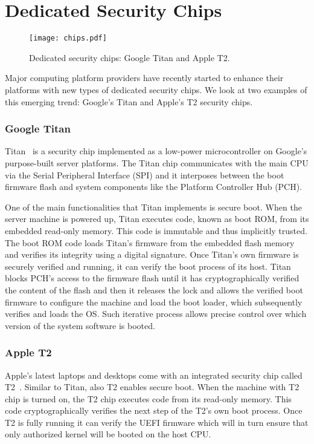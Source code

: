 \section*{Dedicated Security Chips}

\begin{figure}[t]
	\centering
	\texttt{[image: chips.pdf]}
	\caption{Dedicated security chips: Google Titan and Apple T2.}
\label{fig:prototype}   
\end{figure}


Major computing platform providers have recently started to enhance their platforms with new types of dedicated security chips. We look at two examples of this emerging trend: Google’s Titan and Apple’s T2 security chips.

\subsubsection*{Google Titan}

Titan~\cite{titan} is a security chip implemented as a low-power microcontroller on Google’s purpose-built server platforms. The Titan chip communicates with the main CPU via the Serial Peripheral Interface (SPI) and it interposes between the boot firmware flash and system components like the Platform Controller Hub (PCH).

 One of the main functionalities that Titan implements is secure boot. When the server machine is powered up, Titan executes code, known as boot ROM, from its embedded read-only memory. This code is immutable and thus implicitly trusted. The boot ROM code loads Titan’s firmware from the embedded flash memory and verifies its integrity using a digital signature. Once Titan’s own firmware is securely verified and running, it can verify the boot process of its host. Titan blocks PCH’s access to the firmware flash until it has cryptographically verified the content of the flash and then it releases the lock and allows the verified boot firmware to configure the machine and load the boot loader, which subsequently verifies and loads the OS. Such iterative process allows precise control over which version of the system software is booted. 

 
 \subsubsection*{Apple T2}
 
 Apple’s latest laptops and desktops come with an integrated security chip called T2~\cite{t2}. Similar to Titan, also T2 enables secure boot. When the machine with T2 chip is turned on, the T2 chip executes code from its read-only memory. This code cryptographically verifies the next step of the T2’s own boot process. Once T2 is fully running it can verify the UEFI firmware which will in turn ensure that only authorized kernel will be booted on the host CPU.

